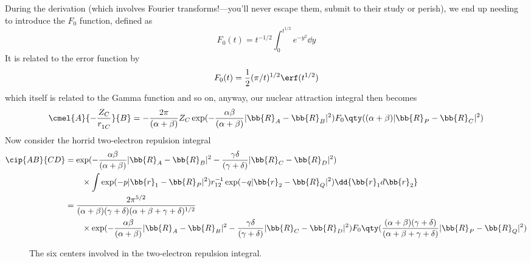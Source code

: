 \documentclass[11pt]{article}
\begin{document}
During the derivation (which involves Fourier transforms!---you'll never escape them, submit to their study or perish), we end up needing to introduce the $F_0$ function, defined as
\begin{equation}\label{key}
F_0 (t) = t^{-1/2} \int_0^{t^{1/2}} e^{-y^2}\dd{y} 
\end{equation}
It is related to the error function by 
\begin{equation}\label{key}
F_0 (t) = \frac{1}{2} (\pi/t)^{1/2} \erf(t^{1/2}) 
\end{equation}
which itself is related to the Gamma function and so on, anyway, our nuclear attraction integral then becomes
\begin{equation}\label{key}
\cmel{A}{-\frac{Z_C}{r_{1C}^{
}}}{B} = -\frac{2\pi}{(\alpha + \beta)} Z_C \exp(-\frac{\alpha \beta}{(\alpha + \beta)}|\bb{R}_A - \bb{R}_B|^2) F_0\qty((\alpha + \beta)|\bb{R}_P - \bb{R}_C|^2)
\end{equation}
Now consider the horrid two-electron repulsion integral 
\begin{align*}
\cip{AB}{CD} &= \exp(-\frac{\alpha\beta}{(\alpha + \beta)} |\bb{R}_A - \bb{R}_B|^2 - \frac{\gamma \delta}{(\gamma + \delta)} |\bb{R}_C - \bb{R}_D|^2 ) \\
&\qquad \times \int \exp(-p|\bb{r}_1 - \bb{R}_P|^2) r_{12}^{-1} \exp(-q |\bb{r}_2 - \bb{R}_Q|^2) \dd{\bb{r}_1 d\bb{r}_2} \\
 &= \frac{2\pi^{5/2}}{(\alpha + \beta)(\gamma + \delta)(\alpha + \beta + \gamma + \delta)^{1/2}}\\
 &\qquad \times \exp(-\frac{\alpha\beta}{(\alpha + \beta)} |\bb{R}_A - \bb{R}_B|^2 - \frac{\gamma \delta}{(\gamma + \delta)} |\bb{R}_C - \bb{R}_D|^2) F_0 \qty(\frac{(\alpha + \beta)(\gamma + \delta)}{(\alpha + \beta + \gamma + \delta)} |\bb{R}_P - \bb{R}_Q|^2)
\end{align*}

\begin{figure}[H]
	\centering
	\caption{The six centers involved in the two-electron repulsion integral. }
\end{figure}
\end{document}
